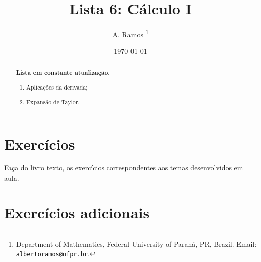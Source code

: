 \documentclass[latin,20pt]{article}
\begin{document}
\title{Lista 6: Cálculo I }
 
\author{
A. Ramos \thanks{Department of Mathematics,
    Federal University of Paraná, PR, Brazil.
    Email: {\tt albertoramos@ufpr.br}.}
}

\date{\today}
 
\maketitle

\begin{abstract}
{\bf Lista em constante atualização}.
 \begin{enumerate}
 \item Aplicações da derivada;
 \item Expansão de Taylor.   
 \end{enumerate}
\end{abstract}

 
  \section{Exercícios}   
 
 Faça do livro texto, os exercícios correspondentes aos temas desenvolvidos em aula. 
  
  \section{Exercícios adicionais}
\end{document}
